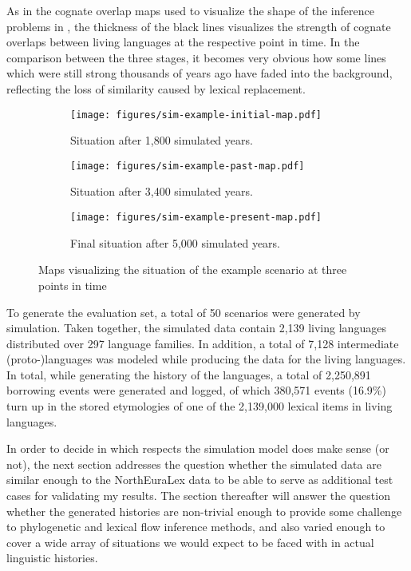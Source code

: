 As in the cognate overlap maps used to visualize the shape of the inference problems in , the thickness of the black lines visualizes the strength of cognate overlaps between living languages at the respective point in time. In the comparison between the three stages, it becomes very obvious how some lines which were still strong thousands of years ago have faded into the background, reflecting the loss of similarity caused by lexical replacement.

\begin{sidewaysfigure}
\begin{subfigure}{0.25\hsize}
 \centering
 \texttt{[image: figures/sim-example-initial-map.pdf]}
 \caption{Situation after 1,800 simulated years.}
 \label{simulated-map-pastA}
\end{subfigure}
%
\begin{subfigure}{0.25\hsize}
 \centering
 \texttt{[image: figures/sim-example-past-map.pdf]}
 \caption{Situation after 3,400 simulated years.}
 \label{simulated-map-pastB}
\end{subfigure}
%
\begin{subfigure}{0.4\hsize}
 \centering
 \texttt{[image: figures/sim-example-present-map.pdf]}
 \caption{Final situation after 5,000 simulated years.}
 \label{simulated-map-present}
\end{subfigure}
 \caption{Maps visualizing the situation of the example scenario at three points in time}
 \label{simulated-maps}
\end{sidewaysfigure}

To generate the evaluation set, a total of 50 scenarios were generated by simulation. Taken together, the simulated data contain 2,139 living languages distributed over 297 language families. In addition, a total of 7,128 intermediate (proto-)languages was modeled while producing the data for the living languages. In total, while generating the history of the languages, a total of 2,250,891 borrowing events were generated and logged, of which 380,571 events (16.9\%) turn up in the stored etymologies of one of the 2,139,000 lexical items in living languages.

\newpage 
In order to decide in which respects the simulation model does make sense (or not), the next section addresses the question whether the simulated data are similar enough to the NorthEuraLex data to be able to serve as additional test cases for validating my results. The section thereafter will answer the question whether the generated histories are non-trivial enough to provide some challenge to phylogenetic and lexical flow inference methods, and also varied enough to cover a wide array of situations we would expect to be faced with in actual linguistic histories.

